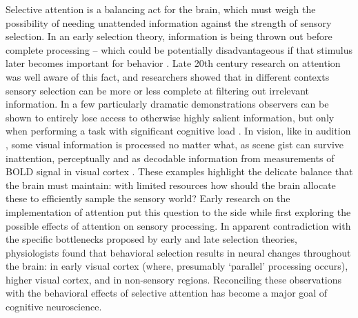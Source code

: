 Selective attention is a balancing act for the brain, which must weigh the possibility of needing unattended information against the strength of sensory selection. In an early selection theory, information is being thrown out before complete processing -- which could be potentially disadvantageous if that stimulus later becomes important for behavior \citep{Mack1998-nq}. Late 20th century research on attention was well aware of this fact, and researchers showed that in different contexts sensory selection can be more or less complete at filtering out irrelevant information. In a few particularly dramatic demonstrations \citep{Haines1991-si,Mack1998-nq,Neisser1979-mm,Simons1999-ng} observers can be shown to entirely lose access to otherwise highly salient information, but only when performing a task with significant cognitive load \citep{Lavie2005-aw,Lavie2004-ub,Rees1997-hd}. In vision, like in audition \citep{Moray1959-fn}, some visual information is processed no matter what, as scene gist can survive inattention, perceptually \citep{Li2002-ji} and as decodable information from measurements of BOLD signal in visual cortex \citep{Peelen2009-us}. These examples highlight the delicate balance that the brain must maintain: with limited resources how should the brain allocate these to efficiently sample the sensory world? Early research on the implementation of attention put this question to the side while first exploring the possible effects of attention on sensory processing. In apparent contradiction with the specific bottlenecks proposed by early and late selection theories, physiologists found that behavioral selection results in neural changes throughout the brain: in early visual cortex (where, presumably `parallel' processing occurs), higher visual cortex, and in non-sensory regions. Reconciling these observations with the behavioral effects of selective attention has become a major goal of cognitive neuroscience. 

